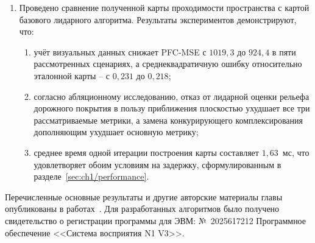 \begin{enumerate}
	\item Проведено сравнение полученной карты проходимости пространства с картой базового лидарного алгоритма. Результаты экспериментов демонстрируют, что:
	\begin{enumerate}
		\item учёт визуальных данных снижает PFC-MSE с $1019,3$ до $924,4$ в пяти рассмотренных сценариях, а среднеквадратичную ошибку относительно эталонной карты -- с $0,231$ до $0,218$;
		\item согласно абляционному исследованию, отказ от лидарной оценки рельефа дорожного покрытия в пользу приближения плоскостью ухудшает все три рассматриваемые метрики, а замена конкурирующего комплексирования дополняющим ухудшает основную метрику;
		\item среднее время одной итерации построения карты составляет $1,63$~мс, что удовлетворяет обоим условиям на задержку, сформулированным в разделе~\cref{sec:ch1/performance}.
	\end{enumerate}
\end{enumerate}

Перечисленные основные результаты и другие авторские материалы гла­вы опубликованы в работах~\cite{Chekanov_icmv_2024, Chekanov_sensys_2025, Chekanov_ecms_2026, Voronkov_ip_2026}. Для разработанных алгоритмов было получено свидетельство о регистрации программы для ЭВМ: №~2025617212 Программное обеспечение <<Система восприятия N1 V3>>.

